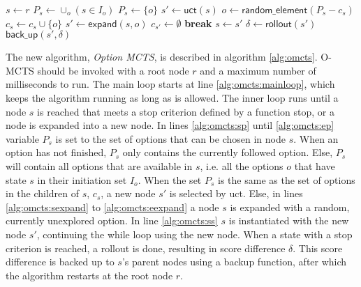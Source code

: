 

\begin{algorithm}
	\caption{$\mathsf{O-MCTS}(r, max\_time)$}
	\label{alg:omcts}
	\begin{algorithmic}[1]
		 \label{alg:omcts:mainloop}
			\State $s \gets r$
			 \label{alg:omcts:innerloop}
				 \label{alg:omcts:sp}
					\State $P_s \gets \cup_o ( s \in I_o)$
				\Else
					\State $P_s \gets \{o\}$ %
				\EndIf \label{alg:omcts:ep}
					\State $s' \gets \mathsf{uct}(s)$ \label{alg:omcts:uct}
				\Else \label{alg:omcts:sexpand}
					\State $o \gets \mathsf{random\_element}(P_s - c_s)$ 
					\State $c_s \gets c_s \cup \{o\}$
					\State $s' \gets \mathsf{expand}(s, o)$
					\State $c_{s'} \gets \emptyset$
					\State \textbf{break} \label{alg:omcts:break}
				\EndIf \label{alg:omcts:eexpand}
				\State $s \gets s'$ \label{alg:omcts:ss}
			\EndWhile
			\State $\delta \gets \mathsf{rollout}(s')$ \label{alg:omcts:rollout}
			\State $\mathsf{back\_up}(s', \delta)$ \label{alg:omcts:backup}
		\EndWhile
		\State {}
	\end{algorithmic}
\end{algorithm}

The new algorithm, \emph{Option MCTS}, is described in algorithm
\ref{alg:omcts}. O-MCTS should be invoked with a root node $r$ and a maximum
number of milliseconds to run. The main loop starts at line
\ref{alg:omcts:mainloop}, which keeps the algorithm running as long as is
allowed. The inner loop runs until a node $s$ is reached that meets a stop
criterion defined by a function \textsf{stop}, or a node is expanded into a new
node. In lines \ref{alg:omcts:sp} until \ref{alg:omcts:ep} variable $P_s$ is set
to the set of options that can be chosen in node $s$. When an option has not
finished, $P_s$ only contains the currently followed option. Else, $P_s$ will
contain all options that are available in $s$, i.e. all the options $o$ that
have state $s$ in their initiation set $I_o$. 
When the set $P_s$ is the same as
the set of options in the children of $s$, $c_s$, a new node $s'$ is selected by
\textsf{uct}. Else, in lines \ref{alg:omcts:sexpand} to \ref{alg:omcts:eexpand}
a node $s$ is expanded with a random, currently unexplored option. In line
\ref{alg:omcts:ss} $s$ is instantiated with the new node $s'$, continuing the
while loop using the new node. When a state with a stop criterion is reached, a
rollout is done, resulting in score difference $\delta$. This score difference
is backed up to $s$'s parent nodes using a backup function, after which the
algorithm restarts at the root node $r$.

